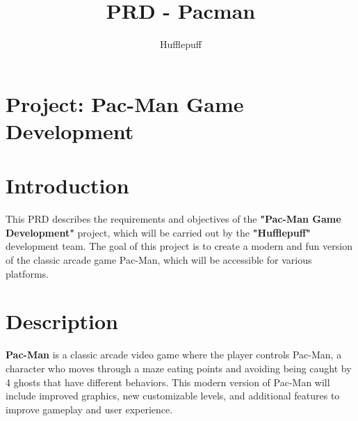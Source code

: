 \documentclass{article}
\title{PRD - Pacman}
\author{Hufflepuff}
\begin{document}
\maketitle

\section*{Project: Pac-Man Game Development}

\section*{Introduction}
This PRD describes the requirements and objectives of the \textbf{"Pac-Man Game Development"} project, which will be carried out by the \textbf{"Hufflepuff"} development team. The goal of this project is to create a modern and fun version of the classic arcade game Pac-Man, which will be accessible for various platforms.

\section*{Description}
\textbf{Pac-Man} is a classic arcade video game where the player controls Pac-Man, a character who moves through a maze eating points and avoiding being caught by 4 ghosts that have different behaviors. This modern version of Pac-Man will include improved graphics, new customizable levels, and additional features to improve gameplay and user experience.
\end{document}
